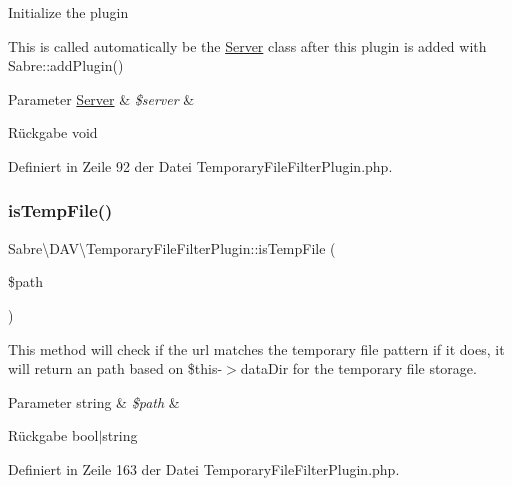 Initialize the plugin

This is called automatically be the \mbox{\hyperlink{class_sabre_1_1_d_a_v_1_1_server}{Server}} class after this plugin is added with Sabre\+::add\+Plugin()


\begin{DoxyParams}[1]{Parameter}
\mbox{\hyperlink{class_sabre_1_1_d_a_v_1_1_server}{Server}} & {\em \$server} & \\
\hline
\end{DoxyParams}
\begin{DoxyReturn}{Rückgabe}
void 
\end{DoxyReturn}


Definiert in Zeile 92 der Datei Temporary\+File\+Filter\+Plugin.\+php.

\mbox{\label{class_sabre_1_1_d_a_v_1_1_temporary_file_filter_plugin_a3f82b019bf7484f8c71a4c89c46d3ccf}} 
\subsubsection{\texorpdfstring{is\+Temp\+File()}{isTempFile()}}
{\footnotesize\ttfamily Sabre\textbackslash{}\+D\+A\+V\textbackslash{}\+Temporary\+File\+Filter\+Plugin\+::is\+Temp\+File (\begin{DoxyParamCaption}\item[{}]{\$path }\end{DoxyParamCaption})\hspace{0.3cm}{\ttfamily [protected]}}

This method will check if the url matches the temporary file pattern if it does, it will return an path based on \$this-\/$>$data\+Dir for the temporary file storage.


\begin{DoxyParams}[1]{Parameter}
string & {\em \$path} & \\
\hline
\end{DoxyParams}
\begin{DoxyReturn}{Rückgabe}
bool$\vert$string 
\end{DoxyReturn}


Definiert in Zeile 163 der Datei Temporary\+File\+Filter\+Plugin.\+php.



